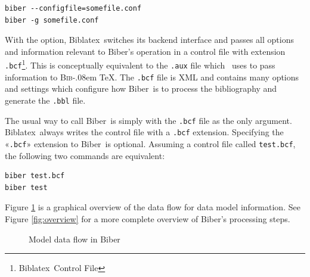 \documentclass{ltxdockit}
\def\BibTeX{\textsc{Bib}\kern-.08em \TeX}
\newcommand*{\biber}{Biber\xspace}
\newcommand*{\biblatex}{Biblatex\xspace}
\begin{document}
\begin{verbatim}
biber --configfile=somefile.conf
biber -g somefile.conf
\end{verbatim}

With the  option, \biblatex\ switches its backend
interface and passes all options and information relevant to \biber's
operation in a control file with extension \verb+.bcf+\footnote{\biblatex\ Control
  File}. This is conceptually equivalent to the \verb+.aux+ file which
\latex\ uses to pass information to \BibTeX. The \verb+.bcf+ file is
XML and contains many options and settings which configure how \biber\
is to process the bibliography and generate the \verb+.bbl+ file.

The usual way to call \biber\ is simply with the \verb+.bcf+ file
as the only argument. \biblatex\ always writes the control file with
a \verb+.bcf+ extension. Specifying the «\verb+.bcf+» extension to
\biber\ is optional. Assuming a control file called
\verb+test.bcf+, the following two commands are equivalent:

\begin{verbatim}
biber test.bcf
biber test
\end{verbatim}

\noindent Figure \ref{fig:biber-mdf} is a graphical overview of the data flow for
data model information. See Figure \ref{fig:overview} for a more complete
overview of \biber's processing steps.

\begin{figure}[!htpb]
  \centering\small
  \caption{Model data flow in \biber}
  \label{fig:biber-mdf}
\end{figure}
\bigskip
\end{document}
